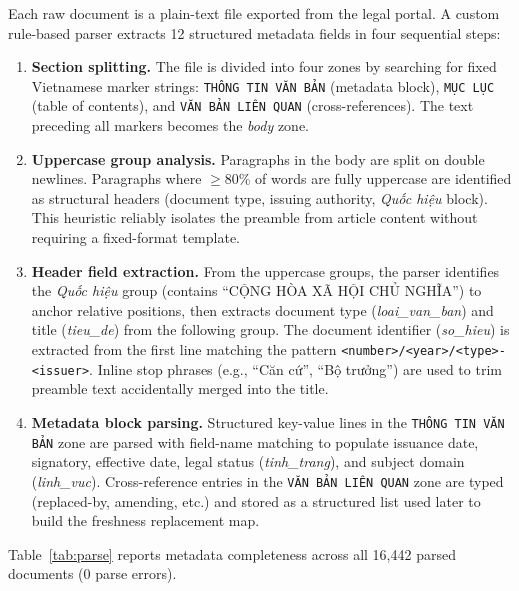 \documentclass[conference]{IEEEtran}
\begin{document}
Each raw document is a plain-text file exported from the legal portal.
A custom rule-based parser extracts 12 structured metadata fields in
four sequential steps:

\begin{enumerate}
  \item \textbf{Section splitting.} The file is divided into four zones
        by searching for fixed Vietnamese marker strings:
        \texttt{THÔNG TIN VĂN BẢN} (metadata block),
        \texttt{MỤC LỤC} (table of contents), and
        \texttt{VĂN BẢN LIÊN QUAN} (cross-references).
        The text preceding all markers becomes the \emph{body} zone.

  \item \textbf{Uppercase group analysis.} Paragraphs in the body are
        split on double newlines. Paragraphs where $\geq$80\% of words
        are fully uppercase are identified as structural headers (document
        type, issuing authority, \emph{Quốc hiệu} block). This heuristic
        reliably isolates the preamble from article content without
        requiring a fixed-format template.

  \item \textbf{Header field extraction.} From the uppercase groups, the
        parser identifies the \emph{Quốc hiệu} group (contains
        ``CỘNG HÒA XÃ HỘI CHỦ NGHĨA'') to anchor relative positions,
        then extracts document type (\emph{loai\_van\_ban}) and title
        (\emph{tieu\_de}) from the following group. The document identifier
        (\emph{so\_hieu}) is extracted from the first line matching the
        pattern \texttt{<number>/<year>/<type>-<issuer>}. Inline stop
        phrases (e.g., ``Căn cứ'', ``Bộ trưởng'') are used to trim
        preamble text accidentally merged into the title.

  \item \textbf{Metadata block parsing.} Structured key-value lines
        in the \texttt{THÔNG TIN VĂN BẢN} zone are parsed with field-name
        matching to populate issuance date, signatory, effective date,
        legal status (\emph{tinh\_trang}), and subject domain
        (\emph{linh\_vuc}). Cross-reference entries in the
        \texttt{VĂN BẢN LIÊN QUAN} zone are typed (replaced-by,
        amending, etc.) and stored as a structured list used later
        to build the freshness replacement map.
\end{enumerate}

Table~\ref{tab:parse} reports metadata completeness across all 16,442
parsed documents (0 parse errors).
\end{document}
